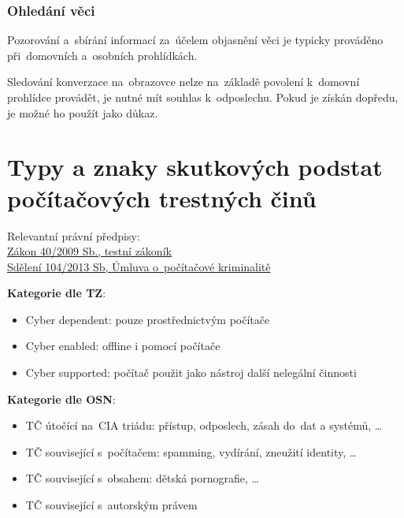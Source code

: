 \subsubsection{Ohledání věci}

Pozorování a~sbírání informací za~účelem objasnění věci je typicky prováděno při~domovních a~osobních prohlídkách.

Sledování konverzace na~obrazovce nelze na~základě povolení k~domovní prohlídce provádět, je nutné mít souhlas k~odposlechu.
Pokud je získán dopředu, je možné ho použít jako důkaz.


\clearpage
\section{Typy a znaky skutkových podstat počítačových trestných činů}

{}Relevantní právní předpisy:
\\\href{https://www.zakonyprolidi.cz/cs/2009-40}{Zákon 40/2009 Sb., testní zákoník}
\\\href{https://www.zakonyprolidi.cz/ms/2013-104}{Sdělení 104/2013 Sb, Úmluva o~počítačové kriminalitě}

\textbf{Kategorie dle TZ}:
\begin{itemize}
\item Cyber dependent: pouze prostřednictvým počítače
\item Cyber enabled: offline i pomocí počítače
\item Cyber supported: počítač použit jako nástroj další nelegální činnosti
\end{itemize}

\textbf{Kategorie dle OSN}:
\begin{itemize}
\item TČ útočící na~CIA triádu: přístup, odposlech, zásah do~dat a systémů, \dots
\item TČ související s~počítačem: spamming, vydírání, zneužití identity, \dots
\item TČ související s~obsahem: dětská pornografie, \dots
\item TČ související s~autorským právem
\end{itemize}


